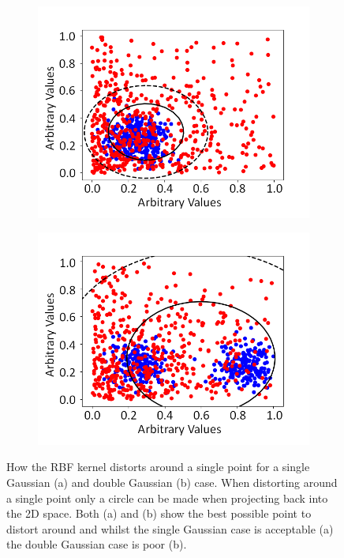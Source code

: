 \begin{figure}[!h]
\centering
\begin{subfigure}{.5\textwidth}
  \centering
  \includegraphics[width=\linewidth]{Appendix1/Figs/singleGaussExp_RbfPointDistortion.png}
  \captionsetup{width=.9\linewidth}
  \caption{}
  \label{subFig:singleGuassPointDist}
\end{subfigure}%
\begin{subfigure}{.5\textwidth}
  \centering
\includegraphics[width=\linewidth]{Appendix1/Figs/doubleGaussExp_RbfPointDistortion.png}
  \captionsetup{width=.9\linewidth}
  \caption{}
  \label{subFig:doubleGaussPointDist}
\end{subfigure}
\caption[RBF kernel distortion around a lone single point for an (x,y) Gaussian and double Gaussian case.]{How the RBF kernel distorts around a single point for a single Gaussian (a) and double Gaussian (b) case. When distorting around a single point only a circle can be made when projecting back into the 2D space. Both (a) and (b) show the best possible point to distort around and whilst the single Gaussian case is acceptable (a) the double Gaussian case is poor (b). }
\label{fig:GuassPointDist}
\end{figure}


